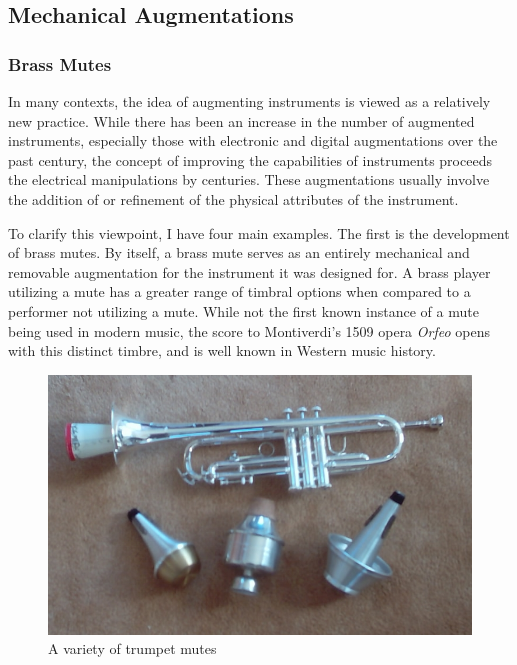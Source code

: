\subsection{Mechanical Augmentations}

\subsubsection{Brass Mutes}
In many contexts, the idea of augmenting instruments is viewed as a relatively new practice. While there has been an increase in the number of augmented instruments, especially those with electronic and digital augmentations over the past century, the concept of improving the capabilities of instruments proceeds the electrical manipulations by centuries. These augmentations usually involve the addition of or refinement of the physical attributes of the instrument.

To clarify this viewpoint, I have four main examples. The first is the development of brass mutes. By itself, a brass mute serves as an entirely mechanical and removable augmentation for the instrument it was designed for. A brass player utilizing a mute has a greater range of timbral options when compared to a performer not utilizing a mute. While not the first known instance of a mute being used in modern music, the score to Montiverdi's 1509 opera \textit{Orfeo} opens with this distinct timbre, and is well known in Western music history.

\begin{figure}
    \centering
    \includegraphics[scale=0.35]{diagrams/TrumpetMutes.jpg}
    \caption{A variety of trumpet mutes} %
    \label{fig:tptmutes}
\end{figure}

